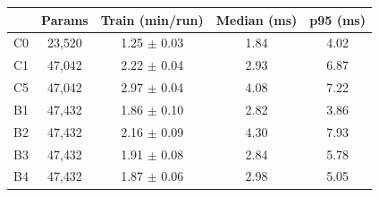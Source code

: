 \begin{tabular}{@{}lcccc@{}}
\toprule
 & Params & Train (min/run) & Median (ms) & p95 (ms) \\
\midrule
C0 & 23{,}520 & 1.25 $\pm$ 0.03 & 1.84 & 4.02 \\
C1 & 47{,}042 & 2.22 $\pm$ 0.04 & 2.93 & 6.87 \\
C5 & 47{,}042 & 2.97 $\pm$ 0.04 & 4.08 & 7.22 \\
B1 & 47{,}432 & 1.86 $\pm$ 0.10 & 2.82 & 3.86 \\
B2 & 47{,}432 & 2.16 $\pm$ 0.09 & 4.30 & 7.93 \\
B3 & 47{,}432 & 1.91 $\pm$ 0.08 & 2.84 & 5.78 \\
B4 & 47{,}432 & 1.87 $\pm$ 0.06 & 2.98 & 5.05 \\
\bottomrule
\end{tabular}
